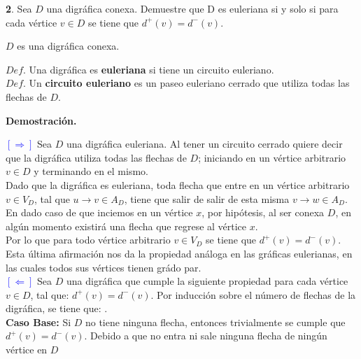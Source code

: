\documentclass[12pt]{article}
\begin{document}
\vspace{1cm}

%
%
\textbf{2}. Sea $D$ una digráfica conexa. Demuestre que D es euleriana si y solo si para cada 
vértice $v \in D$ se tiene que $d^+(v) = d^-(v)$.

\begin{tcolorbox}[title=\textbf{Hipotesis}, colback=red!15!white, colframe=black!]
    $D$ es una digráfica conexa.
\end{tcolorbox}

\begin{tcolorbox}[title=\textbf{Definiciones}, colback=blue!15!white, colframe=black!]
    $Def.$ Una digráfica es \textbf{euleriana} si tiene un circuito euleriano.\\

    $Def.$ Un \textbf{circuito euleriano} es un paseo euleriano cerrado que utiliza todas las flechas 
    de $D$.

\end{tcolorbox}

\textbf{Demostración.}

\textcolor{blue}{$[\Rightarrow]$} Sea $D$ una digráfica euleriana. Al tener un circuito cerrado quiere 
decir que la digráfica utiliza todas las flechas de $D$; iniciando en un vértice arbitrario $v \in D$ 
y terminando en el mismo.\\

Dado que la digráfica es euleriana, toda flecha que entre en un vértice arbitrario $v \in V_D$, tal que 
$u \rightarrow v \in A_D$, tiene que salir de salir de esta misma $v \rightarrow w \in A_D$. En dado caso de 
que inciemos en un vértice $x$, por hipótesis, al ser conexa $D$, en algún momento existirá una flecha 
que regrese al vértice $x$.\\

Por lo que para todo vértice arbitrario $v \in V_D$ se tiene que $d^+(v) = d^-(v)$. Esta última 
afirmación nos da la propiedad análoga en las gráficas eulerianas, en las cuales todos sus vértices tienen 
grádo par.\\

\textcolor{blue}{$[\Leftarrow]$} Sea $D$ una digráfica que cumple la siguiente propiedad para cada 
vértice $v \in D$, tal que: $d^+(v) = d^-(v)$. Por inducción sobre el número de flechas de la digráfica, se tiene que: .\\

\textbf{Caso Base:} Si $D$ no tiene ninguna flecha, entonces trivialmente se cumple que $d^+(v) = d^-(v)$. 
Debido a que no entra ni sale ninguna flecha de ningún vértice en $D$ \\
\end{document}

